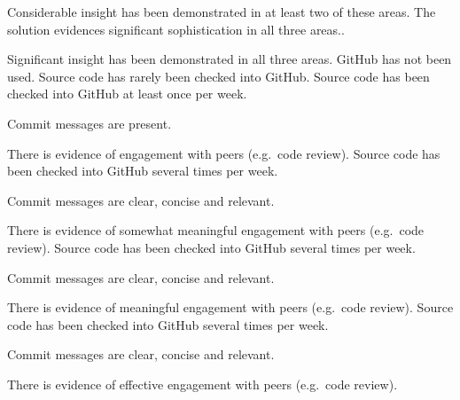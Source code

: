 \documentclass{../fal_assignment}
\begin{document}
\begin{markingrubric}
            \par Considerable insight has been demonstrated in at least two of these areas.
        \grade The solution evidences significant sophistication in all three areas..
            \par Significant insight has been demonstrated in all three areas.
%            
        \grade\fail GitHub has not been used.
        \grade Source code has rarely been checked into GitHub.
        \grade Source code  has been checked into GitHub at least once per week.
            \par Commit messages are present.
            \par There is evidence of engagement with peers (e.g.\ code review).
        \grade Source code  has been checked into GitHub several times per week.
            \par Commit messages are clear, concise and relevant.
            \par There is evidence of somewhat meaningful engagement with peers (e.g.\ code review).
        \grade Source code has been checked into GitHub several times per week.
            \par Commit messages are clear, concise and relevant.
            \par There is evidence of meaningful engagement with peers (e.g.\ code review).
        \grade Source code has been checked into GitHub several times per week.
            \par Commit messages are clear, concise and relevant.
            \par There is evidence of effective engagement with peers (e.g.\ code review).
%
\end{markingrubric}
\end{document}
